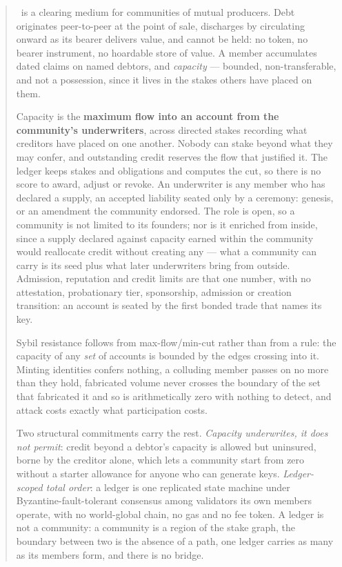 \begin{abstract}
\noindent
\edet\ is a clearing medium for communities of mutual producers. Debt originates
peer-to-peer at the point of sale, discharges by circulating onward as its bearer delivers
value, and cannot be held: no token, no bearer instrument, no hoardable store of value.
A member accumulates dated claims on named debtors, and \emph{capacity} --- bounded,
non-transferable, and not a possession, since it lives in the stakes others have placed on
them.

Capacity is the \textbf{maximum flow into an account from the community's underwriters},
across directed stakes recording what creditors have placed on one another. Nobody can
stake beyond what they may confer, and outstanding credit reserves the flow that justified
it. The ledger keeps stakes and obligations and computes the cut, so there is no score to
award, adjust or revoke. An underwriter is any member who has declared a supply, an
accepted liability seated only by a ceremony: genesis, or an amendment the community
endorsed. The role is open, so a community is not limited to its founders; nor is it
enriched from inside, since a supply declared against capacity earned within the
community would reallocate credit without creating any --- what a community can carry is
its seed plus what later underwriters bring from outside. Admission, reputation and credit
limits are that one number, with no attestation, probationary tier, sponsorship, admission
or creation transition: an account is seated by the first bonded trade that names its key.

Sybil resistance follows from max-flow/min-cut rather than from a rule: the capacity of
any \emph{set} of accounts is bounded by the edges crossing into it. Minting identities
confers nothing, a colluding member passes on no more than they hold, fabricated volume
never crosses the boundary of the set that fabricated it and so is arithmetically zero
with nothing to detect, and attack costs exactly what participation costs.

Two structural commitments carry the rest. \emph{Capacity underwrites, it does not
permit}: credit beyond a debtor's capacity is allowed but uninsured, borne by the creditor
alone, which lets a community start from zero without a starter allowance for anyone who
can generate keys. \emph{Ledger-scoped total order}: a ledger is one replicated state
machine under Byzantine-fault-tolerant consensus among validators its own members operate,
with no world-global chain, no gas and no fee token. A ledger is not a community: a
community is a region of the stake graph, the boundary between two is the absence of a
path, one ledger carries as many as its members form, and there is no bridge.


\end{abstract}
